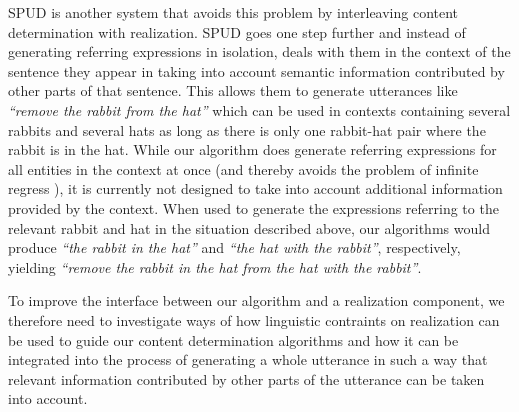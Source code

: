 SPUD \cite{} is another system that avoids this problem by
interleaving content determination with realization. SPUD goes one
step further and instead of generating referring expressions in
isolation, deals with them in the context of the sentence they appear
in taking into account semantic information contributed by other parts
of that sentence. This allows them to generate utterances like
\textit{``remove the rabbit from the hat''} which can be used in contexts
containing several rabbits and several hats as long as there is only
one rabbit-hat pair where the rabbit is in the hat. While our
algorithm does generate referring expressions for all entities in the
context at once (and thereby avoids the problem of infinite regress
), it is currently not designed to take into
account additional information provided by the context. When used to
generate the expressions referring to the relevant rabbit and hat in
the situation described above, our algorithms would produce
\textit{``the rabbit in the hat''} and \textit{``the hat with the
rabbit''}, respectively, yielding \textit{``remove the rabbit in the
hat from the hat with the rabbit''}.

To improve the interface between our algorithm and a realization
component, we therefore need to investigate ways of how linguistic
contraints on realization can be used to guide our content
determination algorithms and how it can be integrated into the process
of generating a whole utterance in such a way that relevant
information contributed by other parts of the utterance can be taken
into account.





